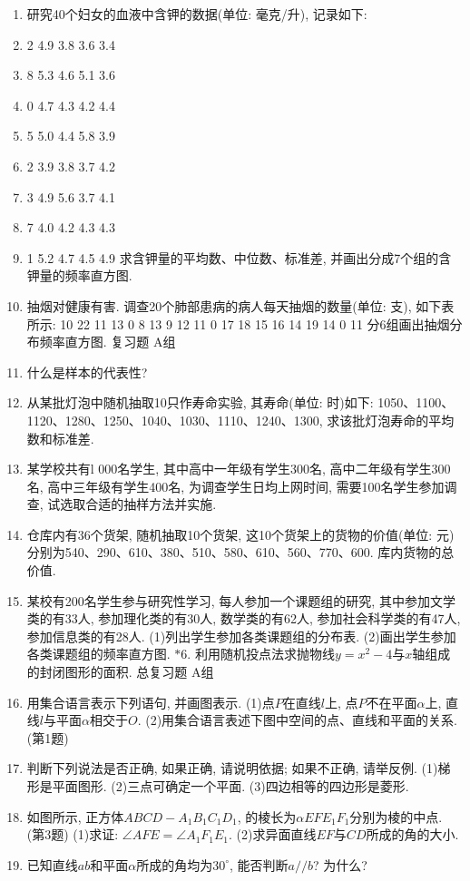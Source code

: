 \documentclass[10pt,a4paper]{article}
\begin{document}
\begin{enumerate}[1.]
\item 研究40个妇女的血液中含钾的数据(单位: 毫克/升), 记录如下:
\item 2	4.9	3.8	3.6	3.4
\item 8	5.3	4.6	5.1	3.6
\item 0	4.7	4.3	4.2	4.4
\item 5	5.0	4.4	5.8	3.9
\item 2	3.9	3.8	3.7	4.2
\item 3	4.9	5.6	3.7	4.1
\item 7	4.0	4.2	4.3	4.3
\item 1	5.2	4.7	4.5	4.9
求含钾量的平均数、中位数、标准差, 并画出分成7个组的含钾量的频率直方图.
\item 抽烟对健康有害. 调查20个肺部患病的病人每天抽烟的数量(单位: 支), 如下表所示:
10	22	11	13	0
8	13	9	12	11
0	17	18	15	16
14	19	14	0	11
分6组画出抽烟分布频率直方图.
复习题
A组
\item 什么是样本的代表性?
\item 从某批灯泡中随机抽取10只作寿命实验, 其寿命(单位: 时)如下: 1050、1100、1120、1280、1250、1040、1030、1110、1240、1300, 求该批灯泡寿命的平均数和标准差.
\item 某学校共有l 000名学生, 其中高中一年级有学生300名, 高中二年级有学生300名, 高中三年级有学生400名, 为调查学生日均上网时间, 需要100名学生参加调查, 试选取合适的抽样方法并实施.
\item 仓库内有36个货架, 随机抽取10个货架, 这10个货架上的货物的价值(单位: 元)分别为540、290、610、380、510、580、610、560、770、600. 库内货物的总价值.
\item 某校有200名学生参与研究性学习, 每人参加一个课题组的研究, 其中参加文学类的有33人, 参加理化类的有30人, 数学类的有62人, 参加社会科学类的有47人, 参加信息类的有28人.
(1)列出学生参加各类课题组的分布表.
(2)画出学生参加各类课题组的频率直方图.
$*$6. 利用随机投点法求抛物线$y=x^2-4$与$x$轴组成的封闭图形的面积.
总复习题
A组
\item 用集合语言表示下列语句, 并画图表示.
(1)点$P$在直线$l$上, 点$P$不在平面$\alpha$上, 直线$l$与平面$\alpha$相交于$O$.
(2)用集合语言表述下图中空间的点、直线和平面的关系.
(第1题)
\item 判断下列说法是否正确, 如果正确, 请说明依据; 如果不正确, 请举反例.
(1)梯形是平面图形.
(2)三点可确定一个平面.
(3)四边相等的四边形是菱形.
\item 如图所示, 正方体$ABCD-A_1B_1C_1D_1$, 的棱长为$\alpha EFE_1F_1$分别为棱的中点.
(第3题)
(1)求证: $\angle AFE=\angle A_1F_1E_1$.
(2)求异面直线$EF$与$CD$所成的角的大小.
\item 已知直线$ab$和平面$\alpha$所成的角均为$30^\circ$, 能否判断$a//b$? 为什么?

\end{enumerate}
\end{document}
